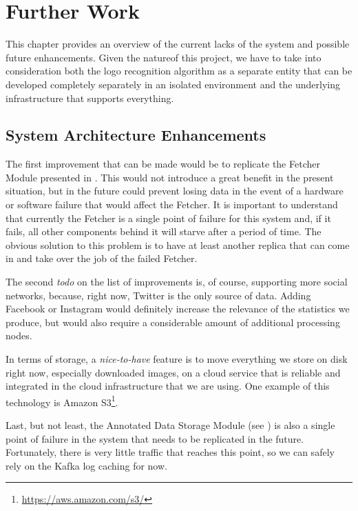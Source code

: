 \chapter{Further Work}

This chapter provides an overview of the current lacks of the system and
possible future enhancements. Given the natureof this project, we have to take into
consideration both the logo recognition algorithm as a separate entity that
can be developed completely separately in an isolated environment and the
underlying infrastructure that supports everything.

\section{System Architecture Enhancements}

The first improvement that can be made would be to replicate the Fetcher
Module presented in . This would
not introduce a great benefit in the present situation, but in the future
could prevent losing data in the event of a hardware or software failure that
would affect the Fetcher. It is important to understand that currently the
Fetcher is a single point of failure for this system and, if it fails, all
other components behind it will starve after a period of time. The obvious
solution to this problem is to have at least another replica that can come in and
take over the job of the failed Fetcher.

The second \textit{todo} on the list of improvements is, of course, supporting
more social networks, because, right now, Twitter is the only source of data.
Adding Facebook or Instagram would definitely increase the relevance of the
statistics we produce, but would also require a considerable amount of
additional processing nodes.

In terms of storage, a \textit{nice-to-have} feature is to move everything we
store on disk right now, especially downloaded images, on a cloud service that
is reliable and integrated in the cloud infrastructure that we are using. One
example of this technology is Amazon
S3\footnote{\url{https://aws.amazon.com/s3/}}.

Last, but not least, the Annotated Data Storage Module (see
) is also a single point of failure
in the system that needs to be replicated in the future. Fortunately, there is
very little traffic that reaches this point, so we can safely rely on the
Kafka log caching for now.

